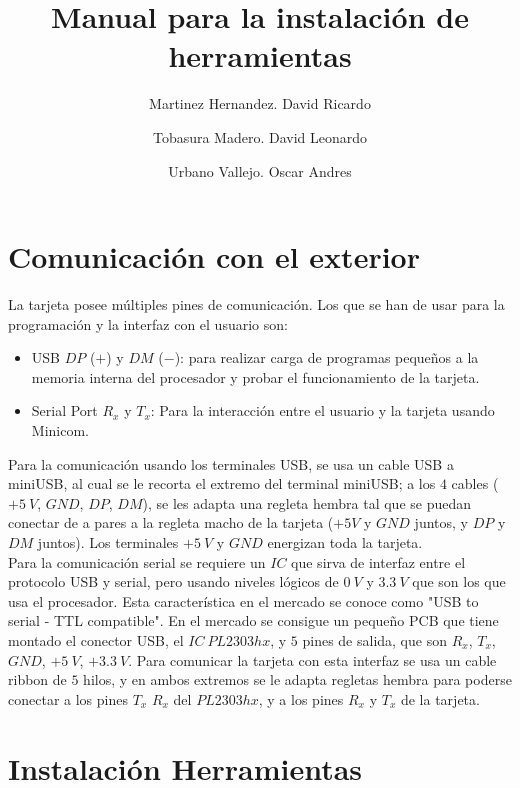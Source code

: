 \documentclass[12pt]{article}
\begin{document}
\title{\huge Manual para la instalación de herramientas}

\author[1]{Martinez Hernandez. David Ricardo}
\author[2]{Tobasura Madero. David Leonardo}
\author[3]{Urbano Vallejo. Oscar Andres}

\date{}
\maketitle

\section{Comunicación con el exterior}
\noindent
La tarjeta posee múltiples pines de comunicación. Los que se han de usar para la programación y la interfaz con el usuario son:
\begin{itemize}
 \item USB $DP$ ($+$) y $DM$ ($-$): para realizar carga de programas pequeños a la memoria interna del procesador y probar el funcionamiento de la tarjeta.
 \item Serial Port $R_{x}$ y $T_{x}$: Para la interacción entre el usuario y la tarjeta usando Minicom.
\end{itemize}
\noindent
Para la comunicación usando los terminales USB, se usa un cable USB a miniUSB, al cual se le recorta el extremo del terminal miniUSB; a los $4$ cables ($+5\ V$, $GND$, $DP$, $DM$), se les adapta una regleta hembra tal que se puedan conectar de a pares a la regleta macho de la tarjeta ($+5V$ y $GND$ juntos, y $DP$ y $DM$ juntos). Los terminales $+5\ V$ y $GND$ energizan toda la tarjeta.\\
Para la comunicación serial se requiere un $IC$ que sirva de interfaz entre el protocolo USB y serial, pero usando niveles lógicos de $0\ V$ y $3.3\ V$ que son los que usa el procesador. Esta característica en el mercado se conoce como "USB to serial - TTL compatible". En el mercado se consigue un pequeño PCB que tiene montado el conector USB, el $IC\ PL2303hx$, y $5$ pines de salida, que son $R_x$, $T_x$, $GND$, $+5\ V$, $+3.3\ V$. Para comunicar la tarjeta con esta interfaz se usa un cable ribbon de $5$ hilos, y en ambos extremos se le adapta regletas hembra para poderse conectar a los pines $T_x$ $R_x$ del $PL2303hx$, y a los pines $R_x$ y $T_x$ de la tarjeta.

\section{Instalación Herramientas}
\noindent
\end{document}
